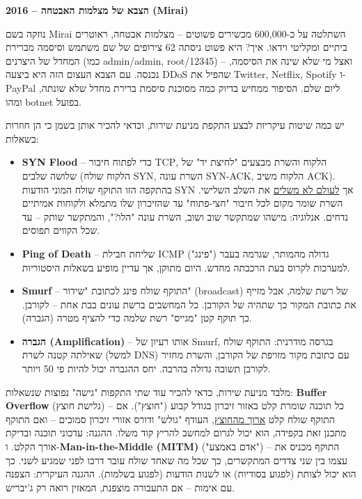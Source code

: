 \documentclass[11pt]{article}
\newcommand{\enLR}[1]{\textenglish{#1}}
\newcommand{\boxtitle}[1]{{\bfseries\color{boxti}#1}}
\newenvironment{storybox}{\colorlet{boxti}{stoti}\begin{mdframed}[backgroundcolor=stobg,linecolor=stofr,rightline=true,leftline=false,topline=false,bottomline=false,linewidth=2pt,innertopmargin=6pt,innerbottommargin=6pt,innerleftmargin=8pt,innerrightmargin=8pt,skipabove=6pt,skipbelow=6pt]}{\end{mdframed}}
\begin{document}
\begin{storybox}\boxtitle{\enLR{2016} – הצבא של מצלמות האבטחה \enLR{(Mirai)}}\par  נוזקה בשם \enLR{Mirai} השתלטה על כ-\enLR{600,000} מכשירים פשוטים – מצלמות אבטחה, ראוטרים ביתיים ומקליטי וידאו. איך? היא פשוט ניסתה \enLR{62} צירופים של שם משתמש וסיסמה מברירת המחדל של היצרנים (כמו \enLR{admin/admin, root/12345)} – ואצל מי שלא שינה את הסיסמה, נכנסה. עם הצבא העצום הזה היא ביצעה \enLR{DDoS} שהפיל את \enLR{Twitter, Netflix, Spotify} ו-\enLR{PayPal} ליום שלם. הסיפור ממחיש בדיוק כמה מסוכנת סיסמת ברירת מחדל שלא שונתה, ומהו \enLR{botnet} בפועל.\end{storybox}

יש כמה שיטות עיקריות לבצע התקפת מניעת שירות, וכדאי להכיר אותן בשמן כי הן חוזרות בשאלות:\par

\begin{itemize}
\item \textbf{\enLR{SYN Flood}} – כדי לפתוח חיבור \enLR{TCP}, הלקוח והשרת מבצעים "לחיצת יד" של שלושה שלבים (הלקוח שולח \enLR{SYN}, השרת עונה \enLR{SYN-ACK}, הלקוח משיב \enLR{ACK).} בהתקפה הזו התוקף שולח המוני הודעות \enLR{SYN} אך \underline{לעולם לא משלים} את השלב השלישי. השרת שומר מקום לכל חיבור "חצי-פתוח" עד שהזיכרון שלו מתמלא ולקוחות אמיתיים נדחים. אנלוגיה: מישהו שמתקשר שוב ושוב, השרת עונה "הלו?", והמתקשר שותק – עד שכל הקווים תפוסים.
\item \textbf{\enLR{Ping of Death}} – שליחת חבילת \enLR{ICMP ("}פינג") גדולה מהמותר, שגרמה בעבר למערכות לקרוס בעת הרכבתה מחדש. היום מתוקן, אך עדיין מופיע בשאלות היסטוריות.
\item \textbf{\enLR{Smurf}} – התוקף שולח פינג לכתובת "שידור" \enLR{(broadcast)} של רשת שלמה, אבל מזייף את כתובת המקור כך שתהיה של הקורבן. כל המחשבים ברשת עונים בבת אחת – לקורבן. כך תוקף קטן "מגייס" רשת שלמה כדי להציף מטרה (הגברה).
\item \textbf{הגברה \enLR{(Amplification)}} – אותו רעיון של \enLR{Smurf}, בגרסה מודרנית: התוקף שולח שאילתה קטנה לשרת (למשל \enLR{DNS)} עם כתובת מקור מזויפת של הקורבן, והשרת מחזיר לקורבן תשובה גדולה בהרבה. יחס ההגברה יכול להיות פי \enLR{50} ויותר.
\end{itemize}

מלבד מניעת שירות, כדאי להכיר עוד שתי התקפות "גישה" נפוצות שנשאלות: \textbf{\enLR{Buffer Overflow}} (גלישת חוצץ) – כל תוכנה שומרת קלט באזור זיכרון בגודל קבוע ("חוצץ"). אם התוקף שולח קלט \underline{ארוך מהחוצץ}, העודף "גולש" ודורס אזורי זיכרון סמוכים – ואם התוקף מתכנן זאת בקפידה, הוא יכול לגרום למחשב להריץ קוד משלו. ההגנה: עדכוני תוכנה ובדיקת אורך הקלט. ו-\textbf{\enLR{Man-in-the-Middle (MITM)}} ("אדם באמצע") – התוקף מכניס את עצמו בין שני צדדים המתקשרים, כך שכל מה שאחד שולח עובר דרכו לפני שמגיע לשני. כך הוא יכול לצותת (לפגוע בסודיות) או לשנות הודעות (לפגוע בשלמות). ההגנה העיקרית: הצפנה עם אימות – אם התעבורה מוצפנת, המאזין רואה רק ג'יבריש.\par
\end{document}
